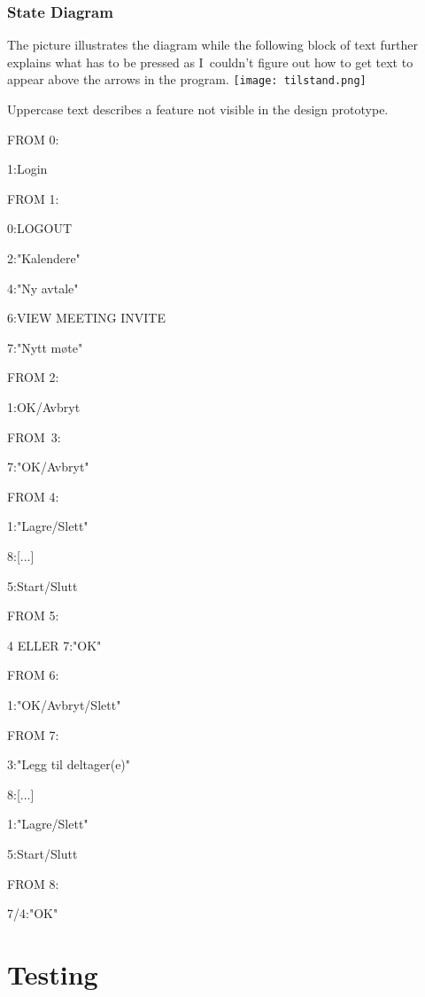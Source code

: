 \documentclass{article}
\begin{document}
\section{State Diagram}

The picture illustrates the diagram while the following block of text
further explains what has to be pressed as I\ couldn't figure out how to get
text to appear above the arrows in the program.\newline
\texttt{[image: tilstand.png]}

Uppercase text describes a feature not visible in the design prototype.

FROM 0:

\qquad \TEXTsymbol{>}1:Login

FROM 1:

\qquad \TEXTsymbol{>}0:LOGOUT

\qquad \TEXTsymbol{>}2:"Kalendere"

\qquad \TEXTsymbol{>}4:"Ny avtale"

\qquad \TEXTsymbol{>}6:VIEW MEETING INVITE

\qquad \TEXTsymbol{>}7:"Nytt m\o te"

FROM 2:

\qquad \TEXTsymbol{>}1:OK/Avbryt

FROM\ 3:

\qquad \TEXTsymbol{>}7:"OK/Avbryt"

FROM 4:

\qquad \TEXTsymbol{>}1:"Lagre/Slett"

\qquad \TEXTsymbol{>}8:[...]

\qquad \TEXTsymbol{>}5:Start/Slutt

FROM 5:

\qquad \TEXTsymbol{>}4 ELLER \TEXTsymbol{>}7:"OK"

FROM 6:

\qquad \TEXTsymbol{>}1:"OK/Avbryt/Slett"

FROM 7:

\qquad \TEXTsymbol{>}3:"Legg til deltager(e)"

\qquad \TEXTsymbol{>}8:[...]

\qquad \TEXTsymbol{>}1:"Lagre/Slett"

\qquad \TEXTsymbol{>}5:Start/Slutt

FROM 8:

\qquad \TEXTsymbol{>}7/4:"OK"
\newpage
\part{Testing}
\end{document}

